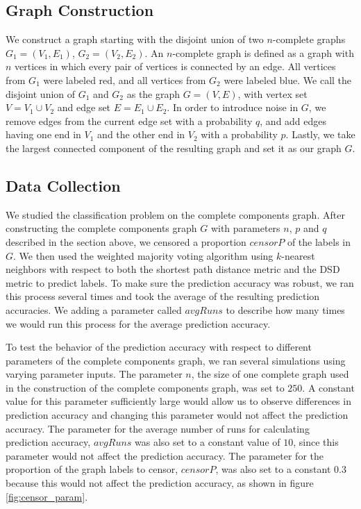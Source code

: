 \subsection{Graph Construction}
We construct a graph starting with the disjoint union of two $n$-complete graphs $G_{1} = (V_{1},E_{1})$, $G_{2} = (V_{2},E_{2})$. An $n$-complete graph is defined as a graph with $n$ vertices in which every pair of vertices is connected by an edge. All vertices from $G_{1}$ were labeled red, and all vertices from $G_{2}$ were labeled blue. We call the disjoint union of $G_{1}$ and $G_{2}$ as the graph $G = (V,E)$, with vertex set $V = V_{1} \cup V_{2}$ and edge set $E = E_{1} \cup E_{2}$. In order to introduce noise in $G$, we remove edges from the current edge set with a probability $q$, and add edges having one end in $V_{1}$ and the other end in $V_{2}$ with a probability $p$. Lastly, we take the largest connected component of the resulting graph and set it as our graph $G$.

\subsection{Data Collection}
We studied the classification problem on the complete components graph. After constructing the complete components graph $G$ with parameters $n$, $p$ and $q$ described in the section above, we censored a proportion $censorP$ of the labels in $G$. We then used the weighted majority voting algorithm using $k$-nearest neighbors with respect to both the shortest path distance metric and the DSD metric to predict labels. To make sure the prediction accuracy was robust, we ran this process several times and took the average of the resulting prediction accuracies. We adding a parameter called $avgRuns$ to describe how many times we would run this process for the average prediction accuracy.

To test the behavior of the prediction accuracy with respect to different parameters of the complete components graph, we ran several simulations using varying parameter inputs. The parameter $n$, the size of one complete graph used in the construction of the complete components graph, was set to $250$. A constant value for this parameter sufficiently large would allow us to observe differences in prediction accuracy and changing this parameter would not affect the prediction accuracy. The parameter for the average number of runs for calculating prediction accuracy, $avgRuns$ was also set to a constant value of $10$, since this parameter would not affect the prediction accuracy. The parameter for the proportion of the graph labels to censor, $censorP$, was also set to a constant $0.3$ because this would not affect the prediction accuracy, as shown in figure \ref{fig:censor_param}.

